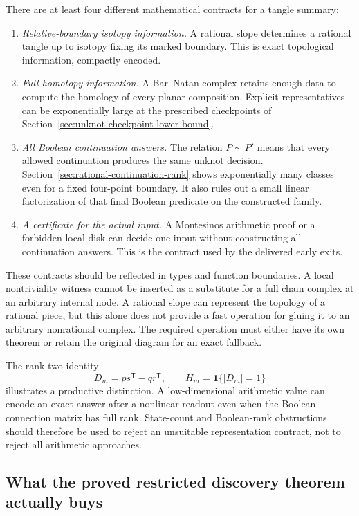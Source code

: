 \documentclass[11pt,a4paper]{article}
\theoremstyle{definition}
\theoremstyle{remark}
\numberwithin{equation}{section}
\begin{document}
There are at least four different mathematical contracts for a tangle
summary:
\begin{enumerate}
\item \emph{Relative-boundary isotopy information.}
A rational slope determines a rational tangle up to isotopy fixing its
marked boundary. This is exact topological information, compactly encoded.
\item \emph{Full homotopy information.}
A Bar--Natan complex retains enough data to compute the homology of every
planar composition. Explicit representatives can be exponentially large
at the prescribed checkpoints of Section~\ref{sec:unknot-checkpoint-lower-bound}.
\item \emph{All Boolean continuation answers.}
The relation \(P\sim P'\) means that every allowed continuation produces
the same unknot decision. Section~\ref{sec:rational-continuation-rank}
shows exponentially many classes even for a fixed four-point boundary.
It also rules out a small linear factorization of that final Boolean
predicate on the constructed family.
\item \emph{A certificate for the actual input.}
A Montesinos arithmetic proof or a forbidden local disk can decide
one input without constructing all continuation answers. This is the
contract used by the delivered early exits.
\end{enumerate}

These contracts should be reflected in types and function boundaries.
A local nontriviality witness cannot be inserted as a substitute for a
full chain complex at an arbitrary internal node. A rational slope can
represent the topology of a rational piece, but this alone does not provide
a fast operation for gluing it to an arbitrary nonrational complex.
The required operation must either have its own theorem or retain the
original diagram for an exact fallback.

The rank-two identity
\[
 D_m=ps^{\mathsf T}-qr^{\mathsf T},
 \qquad H_m=\mathbf1\{|D_m|=1\}
\]
illustrates a productive distinction. A low-dimensional arithmetic value
can encode an exact answer after a nonlinear readout even when the
Boolean connection matrix has full rank. State-count and Boolean-rank
obstructions should therefore be used to reject an unsuitable
representation contract, not to reject all arithmetic approaches.

\subsection{What the proved restricted discovery theorem actually buys}
\end{document}
